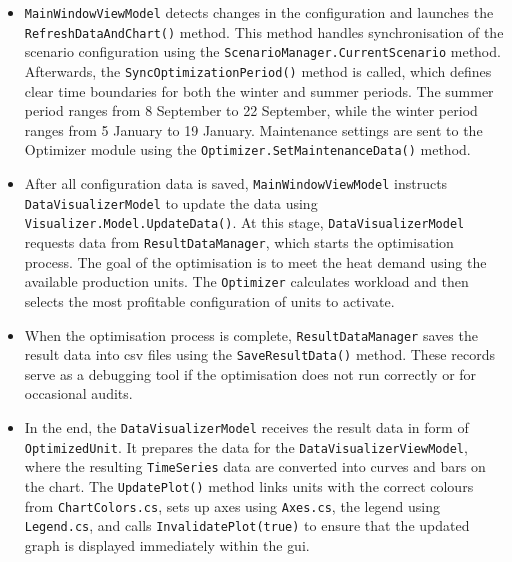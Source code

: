\begin{enumerate}
    \begin{itemize}
        \item \texttt{MainWindow}\allowbreak\texttt{ViewModel} detects changes in the configuration and launches the \texttt{RefreshData}\allowbreak\texttt{AndChart()} method. This method handles synchronisation of the scenario configuration using the \texttt{ScenarioManager.}\allowbreak\texttt{CurrentScenario} method. Afterwards, the \texttt{SyncOptimization}\allowbreak\texttt{Period()} method is called, which defines clear time boundaries for both the winter and summer periods. The summer period ranges from 8 September to 22 September, while the winter period ranges from 5 January to 19 January. Maintenance settings are sent to the Optimizer module using the \texttt{Optimizer.}\allowbreak\texttt{SetMaintenanceData()} method.
        \item After all configuration data is saved, \texttt{MainWindow}\allowbreak\texttt{ViewModel} instructs \texttt{DataVisualizer}\allowbreak\texttt{Model} to update the data using \texttt{Visualizer.}\allowbreak\texttt{Model.}\allowbreak\texttt{UpdateData()}. At this stage, \texttt{DataVisualizer}\allowbreak\texttt{Model} requests data from \texttt{ResultData}\allowbreak\texttt{Manager}, which starts the optimisation process. The goal of the optimisation is to meet the heat demand using the available production units. The \texttt{Optimizer} calculates workload and then selects the most profitable configuration of units to activate.
        \item When the optimisation process is complete, \texttt{ResultData}\allowbreak\texttt{Manager} saves the result data into \acrshort{csv} files using the \texttt{SaveResultData()} method. These records serve as a debugging tool if the optimisation does not run correctly or for occasional audits.
        \item In the end, the \texttt{DataVisualizer}\allowbreak\texttt{Model} receives the result data in form of \texttt{OptimizedUnit}. It prepares the data for the \texttt{DataVisualizer}\allowbreak\texttt{ViewModel}, where the resulting \texttt{TimeSeries} data are converted into curves and bars on the chart. The \texttt{UpdatePlot()} method links units with the correct colours from \texttt{ChartColors.cs}, sets up axes using \texttt{Axes.cs}, the legend using \texttt{Legend.cs}, and calls \texttt{InvalidatePlot(true)} to ensure that the updated graph is displayed immediately within the \acrshort{gui}.
    \end{itemize}
\end{enumerate}

